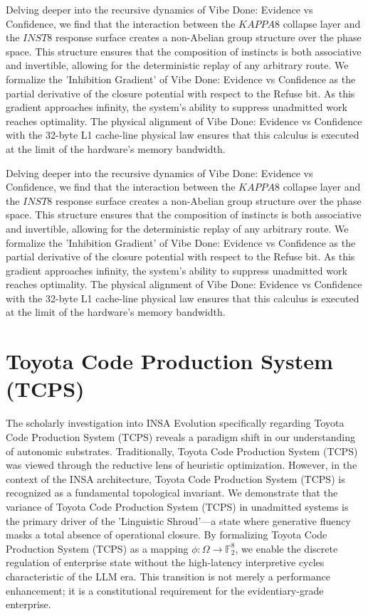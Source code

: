 \documentclass[12pt,a4paper,oneside]{book}
\begin{document}
Delving deeper into the recursive dynamics of Vibe Done: Evidence vs Confidence, we find that the interaction between the $KAPPA8$ collapse layer and the $INST8$ response surface creates a non-Abelian group structure over the phase space. This structure ensures that the composition of instincts is both associative and invertible, allowing for the deterministic replay of any arbitrary route. We formalize the 'Inhibition Gradient' of Vibe Done: Evidence vs Confidence as the partial derivative of the closure potential with respect to the Refuse bit. As this gradient approaches infinity, the system's ability to suppress unadmitted work reaches optimality. The physical alignment of Vibe Done: Evidence vs Confidence with the 32-byte L1 cache-line physical law ensures that this calculus is executed at the limit of the hardware's memory bandwidth. 

Delving deeper into the recursive dynamics of Vibe Done: Evidence vs Confidence, we find that the interaction between the $KAPPA8$ collapse layer and the $INST8$ response surface creates a non-Abelian group structure over the phase space. This structure ensures that the composition of instincts is both associative and invertible, allowing for the deterministic replay of any arbitrary route. We formalize the 'Inhibition Gradient' of Vibe Done: Evidence vs Confidence as the partial derivative of the closure potential with respect to the Refuse bit. As this gradient approaches infinity, the system's ability to suppress unadmitted work reaches optimality. The physical alignment of Vibe Done: Evidence vs Confidence with the 32-byte L1 cache-line physical law ensures that this calculus is executed at the limit of the hardware's memory bandwidth. 

\section{Toyota Code Production System (TCPS)}
The scholarly investigation into INSA Evolution specifically regarding Toyota Code Production System (TCPS) reveals a paradigm shift in our understanding of autonomic substrates. Traditionally, Toyota Code Production System (TCPS) was viewed through the reductive lens of heuristic optimization. However, in the context of the INSA architecture, Toyota Code Production System (TCPS) is recognized as a fundamental topological invariant. We demonstrate that the variance of Toyota Code Production System (TCPS) in unadmitted systems is the primary driver of the 'Linguistic Shroud'---a state where generative fluency masks a total absence of operational closure. By formalizing Toyota Code Production System (TCPS) as a mapping $\phi: \Omega \to \mathbb{F}_2^8$, we enable the discrete regulation of enterprise state without the high-latency interpretive cycles characteristic of the LLM era. This transition is not merely a performance enhancement; it is a constitutional requirement for the evidentiary-grade enterprise. 
\end{document}
